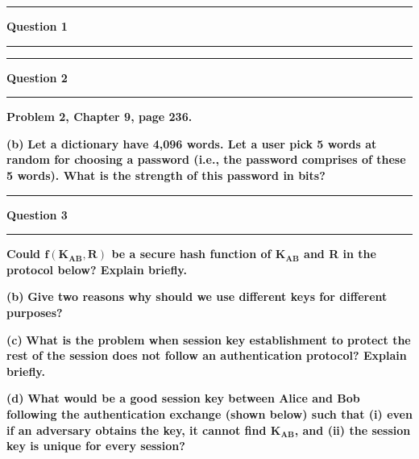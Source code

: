 \documentclass[11pt]{article}
\newcommand\question[2]{\vspace{.25in}\hrule\textbf{#1}\vspace{.5em}\hrule\vspace{.10in}}
\renewcommand\part[1]{\vspace{.10in}\textbf{(#1)}}
\begin{document}
\raggedright
\newcommand\NAME{Jake Pitkin}  %
\newcommand\UID{u0891770}     %
\newcommand\HWNUM{4}              %

\question{Question 1}

\textbf{Suppose a computer is authenticated based on its IP address (no passwords are used). Identify one strength and one weakness of such an authentication mechanism.}

\question{Question 2}

\part{a} \textbf{Problem 2, Chapter 9, page 236.}

\part{b} \textbf{Let a dictionary have 4,096 words. Let a user pick 5 words at random for choosing a password (i.e., the password comprises of these 5 words). What is the strength of this password in bits?}

\question{Question 3}

\part{a} \textbf{Could $\mathbf{f(K_{AB}, R)}$ be a secure hash function of $\mathbf{K_{AB}}$ and R in the protocol below? Explain briefly.}

\part{b} \textbf{Give two reasons why should we use different keys for different purposes?}

\part{c} \textbf{What is the problem when session key establishment to protect the rest of the session does not follow an authentication protocol? Explain briefly.}

\part{d} \textbf{What would be a good session key between Alice and Bob following the authentication exchange (shown below) such that (i) even if an adversary obtains the key, it cannot find $\mathbf{K_{AB}}$, and (ii) the session key is unique for every session?}
\end{document}
